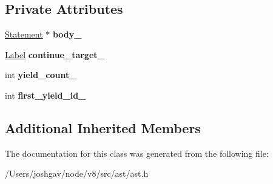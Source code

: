 \subsection*{Private Attributes}
\begin{DoxyCompactItemize}
\item 
\hyperlink{classv8_1_1internal_1_1_statement}{Statement} $\ast$ {\bfseries body\+\_\+}\hypertarget{classv8_1_1internal_1_1_iteration_statement_a54d16a759d266820139edb660d74abf1}{}\label{classv8_1_1internal_1_1_iteration_statement_a54d16a759d266820139edb660d74abf1}

\item 
\hyperlink{classv8_1_1internal_1_1_label}{Label} {\bfseries continue\+\_\+target\+\_\+}\hypertarget{classv8_1_1internal_1_1_iteration_statement_a5c269ca5bee3abbcd997a4ced5f72a2b}{}\label{classv8_1_1internal_1_1_iteration_statement_a5c269ca5bee3abbcd997a4ced5f72a2b}

\item 
int {\bfseries yield\+\_\+count\+\_\+}\hypertarget{classv8_1_1internal_1_1_iteration_statement_affc43dcce24a1a5b6355eb00c09a664b}{}\label{classv8_1_1internal_1_1_iteration_statement_affc43dcce24a1a5b6355eb00c09a664b}

\item 
int {\bfseries first\+\_\+yield\+\_\+id\+\_\+}\hypertarget{classv8_1_1internal_1_1_iteration_statement_a37dc966b65c66344767b7ce4860a6355}{}\label{classv8_1_1internal_1_1_iteration_statement_a37dc966b65c66344767b7ce4860a6355}

\end{DoxyCompactItemize}
\subsection*{Additional Inherited Members}


The documentation for this class was generated from the following file\+:\begin{DoxyCompactItemize}
\item 
/\+Users/joshgav/node/v8/src/ast/ast.\+h\end{DoxyCompactItemize}
